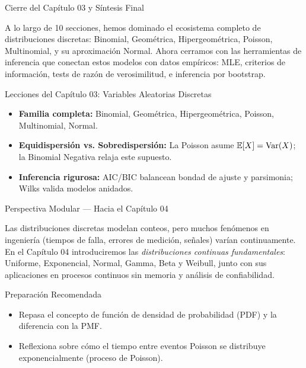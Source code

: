 \documentclass[10pt, aspectratio=169]{beamer}
\begin{document}
\begin{frame}{Cierre del Capítulo 03 y Síntesis Final}
  \begin{reflexion}
    A lo largo de 10 secciones, hemos dominado el ecosistema completo de distribuciones discretas: Binomial, Geométrica, Hipergeométrica, Poisson, Multinomial, y su aproximación Normal. Ahora cerramos con las herramientas de inferencia que conectan estos modelos con datos empíricos: MLE, criterios de información, tests de razón de verosimilitud, e inferencia por bootstrap.
  \end{reflexion}

  \vspace{0.2cm}
  \pause
  \begin{block}{Lecciones del Capítulo 03: Variables Aleatorias Discretas}
    \begin{itemize}\itemsep=0.06cm
      \item \textbf{Familia completa:} Binomial, Geométrica, Hipergeométrica, Poisson, Multinomial, Normal.
      \item \textbf{Equidispersión vs. Sobredispersión:} La Poisson asume $\mathbb{E}[X] = \operatorname{Var}(X)$; la Binomial Negativa relaja este supuesto.
      \item \textbf{Inferencia rigurosa:} AIC/BIC balancean bondad de ajuste y parsimonia; Wilks valida modelos anidados.
    \end{itemize}
  \end{block}
\end{frame}

\begin{frame}{Perspectiva Modular --- Hacia el Capítulo 04}
  \scriptsize
  \begin{retoclase}
    Las distribuciones discretas modelan conteos, pero muchos fenómenos en ingeniería (tiempos de falla, errores de medición, señales) varían continuamente. En el Capítulo 04 introduciremos las \emph{distribuciones continuas fundamentales}: Uniforme, Exponencial, Normal, Gamma, Beta y Weibull, junto con sus aplicaciones en procesos continuos sin memoria y análisis de confiabilidad.
  \end{retoclase}

  \vspace{0.08cm}
  \pause
  \begin{alertblock}{Preparación Recomendada}
    \begin{itemize}\itemsep=0.06cm
      \item Repasa el concepto de función de densidad de probabilidad (PDF) y la diferencia con la PMF.
      \item Reflexiona sobre cómo el tiempo entre eventos Poisson se distribuye exponencialmente (proceso de Poisson).
    \end{itemize}
  \end{alertblock}
\end{frame}
\end{document}
